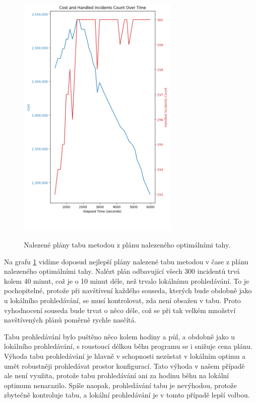 \begin{figure}[H]
  \caption{Nalezené plány tabu metodou z plánu nalezeného optimálními tahy.}
  \includegraphics[width=0.7\textwidth,height=0.9\textwidth]{img/plots/tabuSearch_fromOptimal.png}
  \centering
  \label{img:hybrid_tabu}
\end{figure}

Na grafu \ref{img:hybrid_tabu} vidíme doposud nejlepší plány nalezené tabu metodou v čase z plánu nalezeného optimálními tahy. 
Nalézt plán odbavující všech 300 incidentů trvá kolem 40 minut, což je o 10 minut déle, než trvalo lokálnímu prohledávání. 
To je pochopitelné, protože při navštívení každého souseda, kterých bude obdobně jako u lokálního prohledávání, se musí kontrolovat,
zda není obsažen v tabu. Proto vyhodnocení souseda bude trvat o něco déle, což se při tak velkém množství navštívených plánů poměrně rychle nasčítá.

Tabu prohledávání bylo puštěno něco kolem hodiny a půl, a obdobně jako u lokálního prohledávání, s roustoucí délkou běhu programu se i snižuje cena plánu.
Výhoda tabu prohledávání je hlavně v schopnosti nezůstat v lokálním optimu a umět robustněji prohledávat prostor konfigurací.
Tato výhoda v našem případě ale není využita, protože tabu prohledávání ani za hodinu běhu na lokální optimum nenarazilo.
Spíše naopak, prohledávání tabu je nevýhodou, protože zbytečně kontroluje tabu, a lokální prohledávání je v tomto případě lepší volbou.

